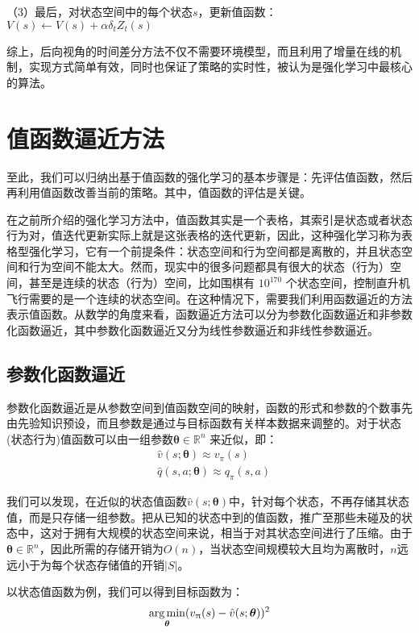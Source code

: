 （3）最后，对状态空间中的每个状态$s$，更新值函数：$V(s) \gets V(s)+\alpha \delta_{t} Z_{t}(s)$

综上，后向视角的时间差分方法不仅不需要环境模型，而且利用了增量在线的机制，实现方式简单有效，同时也保证了策略的实时性，被认为是强化学习中最核心的算法。

\section{值函数逼近方法}
至此，我们可以归纳出基于值函数的强化学习的基本步骤是：先评估值函数，然后再利用值函数改善当前的策略。其中，值函数的评估是关键。

在之前所介绍的强化学习方法中，值函数其实是一个表格，其索引是状态或者状态行为对，值迭代更新实际上就是这张表格的迭代更新，因此，这种强化学习称为表格型强化学习，它有一个前提条件：状态空间和行为空间都是离散的，并且状态空间和行为空间不能太大。然而，现实中的很多问题都具有很大的状态（行为）空间，甚至是连续的状态（行为）空间，比如围棋有 $10^{170}$  个状态空间，控制直升机飞行需要的是一个连续的状态空间。在这种情况下，需要我们利用函数逼近的方法表示值函数。从数学的角度来看，函数逼近方法可以分为参数化函数逼近和非参数化函数逼近，其中参数化函数逼近又分为线性参数逼近和非线性参数逼近。

\subsection{参数化函数逼近}
参数化函数逼近是从参数空间到值函数空间的映射，函数的形式和参数的个数事先由先验知识预设，而且参数是通过与目标函数有关样本数据来调整的。对于状态(状态行为)值函数可以由一组参数$\bm{\theta}\in \mathbb{R}^{n} $ 来近似，即：
\begin{equation}
\label{seq_2_3_2}
\begin{aligned}
&\hat{v}(s;\bm{\theta})\approx v_{\pi}(s)\\
&\hat{q}(s,a;\bm{\theta})\approx q_{\pi}(s,a)
\end{aligned}
\end{equation}

我们可以发现，在近似的状态值函数$\hat{v}(s;\bm{\theta})$中，针对每个状态，不再存储其状态值，而是只存储一组参数。把从已知的状态中到的值函数，推广至那些未碰及的状态中，这对于拥有大规模的状态空间来说，相当于对其状态空间进行了压缩。由于 $\bm{\theta}\in \mathbb{R}^{n}$，因此所需的存储开销为$O(n)$，当状态空间规模较大且均为离散时，$n$远远小于为每个状态存储值的开销$|S|$。

以状态值函数为例，我们可以得到目标函数为：
\begin{equation}
\label{seq:fun_approxi_obj}
\begin{aligned}
\operatorname*{arg\,min}_{\bm{\theta}}(v_{\uppi}(s)-\hat{v}(s;\bm{\theta}))^2
\end{aligned}
\end{equation}

